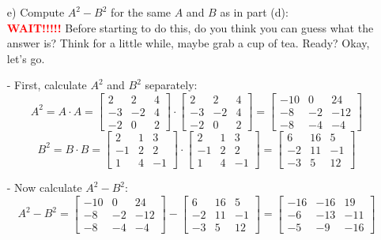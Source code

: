 \begin{sol}
\begin{enumerate}
          
        \item[e)] Compute $A^2 - B^2$ for the same $A$ and $B$ as in part (d): \\
        \textbf{\textcolor{red}{WAIT!!!!!}}
        Before starting to do this, do you think you can guess what the answer is? Think for a little while, maybe grab a cup of tea. Ready? Okay, let's go.

        - First, calculate $A^2$ and $B^2$ separately:
          \[
          A^2 = A \cdot A = \begin{bmatrix} 2 & 2 & 4 \\ -3 & -2 & 4 \\ -2 & 0 & 2 \end{bmatrix} \cdot \begin{bmatrix} 2 & 2 & 4 \\ -3 & -2 & 4 \\ -2 & 0 & 2 \end{bmatrix} = \begin{bmatrix} -10 & 0 & 24 \\ -8 & -2 & -12 \\ -8 & -4 & -4 \end{bmatrix}
          \]
          \[
          B^2 = B \cdot B = \begin{bmatrix} 2 & 1 & 3 \\ -1 & 2 & 2 \\ 1 & 4 & -1 \end{bmatrix} \cdot \begin{bmatrix} 2 & 1 & 3 \\ -1 & 2 & 2 \\ 1 & 4 & -1 \end{bmatrix} = \begin{bmatrix} 6 & 16 & 5 \\ -2 & 11 & -1 \\ -3 & 5 & 12 \end{bmatrix}
          \]

        - Now calculate $A^2 - B^2$:
          \[
          A^2 - B^2 = \begin{bmatrix} -10 & 0 & 24 \\ -8 & -2 & -12 \\ -8 & -4 & -4 \end{bmatrix} - \begin{bmatrix} 6 & 16 & 5 \\ -2 & 11 & -1 \\ -3 & 5 & 12 \end{bmatrix} = \begin{bmatrix} -16 & -16 & 19 \\ -6 & -13 & -11 \\ -5 & -9 & -16 \end{bmatrix} 
          \]


\end{enumerate}
\end{sol}

